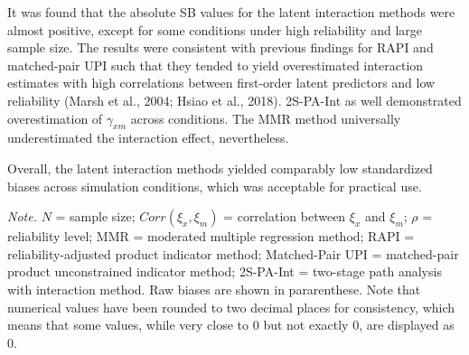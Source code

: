 \documentclass[
  man]{apa6}
\newenvironment{lltable}{\begin{landscape}\centering\begin{ThreePartTable}}{\end{ThreePartTable}\end{landscape}}
\begin{document}
It was found that the absolute SB values for the latent interaction methods were almost positive, except for some conditions under high reliability and large sample size. The results were consistent with previous findings for RAPI and matched-pair UPI such that they tended to yield overestimated interaction estimates with high correlations between first-order latent predictors and low reliability (Marsh et al., 2004; Hsiao et al., 2018). 2S-PA-Int as well demonstrated overestimation of \(\gamma_{xm}\) across conditions. The MMR method universally underestimated the interaction effect, nevertheless.

Overall, the latent interaction methods yielded comparably low standardized biases across simulation conditions, which was acceptable for practical use.

\begin{lltable}

\begin{TableNotes}[para]
\normalsize{\textit{Note.} $\textit{N}$ = sample size; $Corr(\xi_{x}, \xi_{m})$ = correlation between $\xi_{x}$ and $\xi_{m}$; $\rho$ = reliability level; MMR = moderated multiple regression method; RAPI = reliability-adjusted product indicator method; Matched-Pair UPI = matched-pair product unconstrained indicator method; 2S-PA-Int = two-stage path analysis with interaction method. Raw biases are shown in pararenthese. Note that numerical values have been rounded to two decimal places for consistency, which means that some values, while very close to 0 but not exactly 0, are displayed as 0.}
\end{TableNotes}

\tiny{

}
\end{lltable}
\end{document}

